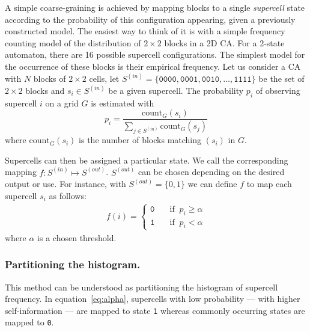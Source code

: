 A simple coarse-graining is achieved by mapping blocks to a single
\emph{supercell} state according to the probability of this configuration
appearing, given a previously constructed model. The easiest way to think of it
is with a simple frequency counting model of the distribution of $2\times 2$
blocks in a 2D CA\@. For a 2-state automaton, there are 16 possible supercell
configurations. The simplest model for the occurrence of these blocks is their
empirical frequency. Let us consider a CA with $N$ blocks of $2\times 2$ cells,
let $S^{(in)} = \{\mathtt{0000}, \mathtt{0001}, \mathtt{0010}, \ldots,
\mathtt{1111}\}$ be the set of $2\times 2$ blocks and $s_i \in S^{(in)}$ be a
given supercell. The probability $p_i$ of observing supercell $i$ on a grid $G$
is estimated with
\begin{equation}
  p_i = \dfrac{\text{count}_G(s_i)}{\sum_{j\in S^{(in)}}\text{count}_G(s_j)}
  \label{eq:stat_est}
\end{equation}
where $\text{count}_G(s_i)$ is the number of blocks matching $(s_i)$ in $G$.

Supercells can then be assigned a particular state. We call the corresponding
mapping $f: S^{(in)} \mapsto S^{(out)}$. $S^{(out)}$ can be chosen depending on
the desired output or use. For instance, with $S^{(out)} = \{0, 1\}$ we can
define $f$ to map each supercell $s_i$ as follows:
\begin{align}
  f(i) = \begin{cases}
    \mathtt{0} &\quad\text{if }\ p_i\geq \alpha\\
    \mathtt{1} &\quad\text{if }\ p_i< \alpha
  \end{cases}
        \label{eq:alpha}
\end{align}
where $\alpha$ is a chosen threshold.

\subsubsection{Partitioning the histogram.}
This method can be understood as partitioning the histogram of supercell
frequency. In equation~\eqref{eq:alpha}, supercells with low probability
--- with higher self-information --- are mapped to state \texttt{1} whereas
commonly occurring states are mapped to \texttt{0}.


